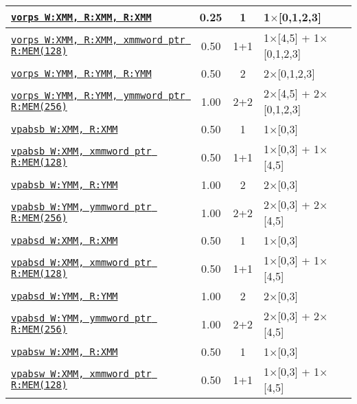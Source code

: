 \documentclass[a4paper,english,fontsize=9]{scrartcl}
\begin{document}
\begin{longtable}{p{}ccL{.25\textwidth}}
  \midrule
  \texttt{\href{https://felixcloutier.com/x86/ORPS.html}{vorps W:XMM, R:XMM, R:XMM}} & 0.25 & 1 & 1\(\times\)[0,1,2,3] \\
  \midrule
  \texttt{\href{https://felixcloutier.com/x86/ORPS.html}{vorps W:XMM, R:XMM, xmmword ptr R:MEM(128)}} & 0.50 & 1+1 & 1\(\times\)[4,5] + 1\(\times\)[0,1,2,3] \\
  \midrule
  \texttt{\href{https://felixcloutier.com/x86/ORPS.html}{vorps W:YMM, R:YMM, R:YMM}} & 0.50 & 2 & 2\(\times\)[0,1,2,3] \\
  \midrule
  \texttt{\href{https://felixcloutier.com/x86/ORPS.html}{vorps W:YMM, R:YMM, ymmword ptr R:MEM(256)}} & 1.00 & 2+2 & 2\(\times\)[4,5] + 2\(\times\)[0,1,2,3] \\
  \midrule
  \texttt{\href{https://felixcloutier.com/x86/PABSB:PABSW:PABSD:PABSQ.html}{vpabsb W:XMM, R:XMM}} & 0.50 & 1 & 1\(\times\)[0,3] \\
  \midrule
  \texttt{\href{https://felixcloutier.com/x86/PABSB:PABSW:PABSD:PABSQ.html}{vpabsb W:XMM, xmmword ptr R:MEM(128)}} & 0.50 & 1+1 & 1\(\times\)[0,3] + 1\(\times\)[4,5] \\
  \midrule
  \texttt{\href{https://felixcloutier.com/x86/PABSB:PABSW:PABSD:PABSQ.html}{vpabsb W:YMM, R:YMM}} & 1.00 & 2 & 2\(\times\)[0,3] \\
  \midrule
  \texttt{\href{https://felixcloutier.com/x86/PABSB:PABSW:PABSD:PABSQ.html}{vpabsb W:YMM, ymmword ptr R:MEM(256)}} & 1.00 & 2+2 & 2\(\times\)[0,3] + 2\(\times\)[4,5] \\
  \midrule
  \texttt{\href{https://felixcloutier.com/x86/PABSB:PABSW:PABSD:PABSQ.html}{vpabsd W:XMM, R:XMM}} & 0.50 & 1 & 1\(\times\)[0,3] \\
  \midrule
  \texttt{\href{https://felixcloutier.com/x86/PABSB:PABSW:PABSD:PABSQ.html}{vpabsd W:XMM, xmmword ptr R:MEM(128)}} & 0.50 & 1+1 & 1\(\times\)[0,3] + 1\(\times\)[4,5] \\
  \midrule
  \texttt{\href{https://felixcloutier.com/x86/PABSB:PABSW:PABSD:PABSQ.html}{vpabsd W:YMM, R:YMM}} & 1.00 & 2 & 2\(\times\)[0,3] \\
  \midrule
  \texttt{\href{https://felixcloutier.com/x86/PABSB:PABSW:PABSD:PABSQ.html}{vpabsd W:YMM, ymmword ptr R:MEM(256)}} & 1.00 & 2+2 & 2\(\times\)[0,3] + 2\(\times\)[4,5] \\
  \midrule
  \texttt{\href{https://felixcloutier.com/x86/PABSB:PABSW:PABSD:PABSQ.html}{vpabsw W:XMM, R:XMM}} & 0.50 & 1 & 1\(\times\)[0,3] \\
  \midrule
  \texttt{\href{https://felixcloutier.com/x86/PABSB:PABSW:PABSD:PABSQ.html}{vpabsw W:XMM, xmmword ptr R:MEM(128)}} & 0.50 & 1+1 & 1\(\times\)[0,3] + 1\(\times\)[4,5] \\

\end{longtable}
\end{document}
